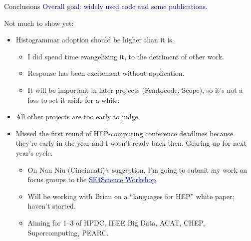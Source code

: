 \documentclass{beamer}
\begin{document}
\begin{frame}{Conclusions}
\vspace{0.5 cm}
\textcolor{darkblue}{Overall goal: widely used code and some publications.}

\vspace{0.25 cm}
Not much to show yet:

\begin{itemize}
\item Histogrammar adoption should be higher than it is.
\begin{itemize}
\item I did spend time evangelizing it, to the detriment of other work.
\item Response has been excitement without application.
\item It will be important in later projects (Femtocode, Scope), so it's not a loss to set it aside for a while.
\end{itemize}

\item All other projects are too early to judge.

\item Missed the first round of HEP-computing conference deadlines because they're early in the year and I wasn't ready back then. Gearing up for next year's cycle.
\begin{itemize}
\item On Nan Niu (Cincinnati)'s suggestion, I'm going to submit my work on focus groups to the \href{http://se4science.org/workshops/}{\textcolor{blue}{SE4Science Workshop}}.
\item Will be working with Brian on a ``languages for HEP'' white paper; haven't started.
\item Aiming for 1--3 of HPDC, IEEE Big Data, ACAT, CHEP, Supercomputing, PEARC.
\end{itemize}
\end{itemize}
\end{frame}
\end{document}
